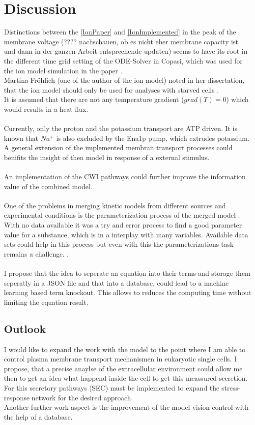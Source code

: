 \section{Discussion}
Distinctions between the \ref{IonPaper} and \ref{IonImplemented} in the peak of the membrane voltage (???? nachschauen, ob es nicht eher membrane capacity ist und dann in der ganzen Arbeit entsprechende updaten) seems to have its root in the different time grid setting of the ODE-Solver in Copasi, which was used for the ion model simulation in the paper \cite{Gerber_2016}.\\
Martina Fröhlich (one of the author of the ion model) noted in her dissertation, that the ion model should only be used for analyses with starved cells \cite{martinafroehlich}.\\
It is assumed that there are not any temperature gradient ($grad(T)=0$) which would results in a heat flux.\\\\
Currently, only the proton and the potassium transport are ATP driven. It is known that $Na^+$ is also excluded by the Ena1p pump, which extrudes potassium. A general extension of the implemented membran transport processes could benifits the insight of then model in response of a external stimulus.\\\\
An implementation of the CWI pathways could further improve the information value of the combined model.\\\\
One of the problems in merging kinetic models from different sources and experimental conditions is the parameterization process of the merged model \cite{Wang2017}. With no data available it was a try and error process to find a good parameter value for a substance, which is in a interplay with many variables. Available data sets could help in this process but even with this the parameterizations task remains a challenge. \cite{Ke_2013}. \\\\
I propose that the idea to seperate an equation into their terms and storage them seperatly in a JSON file and that into a database, could lead to a machine learning based term knockout. This allows to reduces the computing time without limiting the equation result.\\

\subsection{Outlook}
I would like to expand the work with the model to the point where I am able to control plasma membrane transport mechanismen in eukaryotic single cells. I propose, that a precise anaylse of the extracellular environment could allow me then to get an idea what happend inside the cell to get this meassured secretion. For this secretory pathways (SEC) must be implemented to expand the stress-response network for the desired approach.\\
Another further work aspect is the improvement of the model vision control with the help of a database.\\\\
